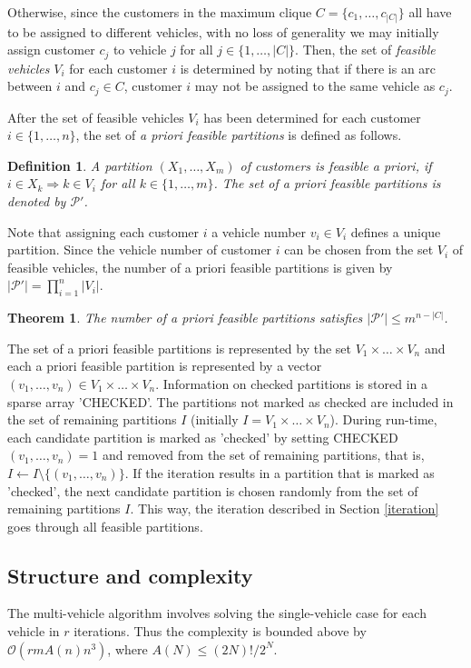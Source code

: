\documentclass[dissertation,draft*]{aaltoseries}
\newtheorem{theorem}{Theorem}
\newtheorem*{definition}{Definition}
\begin{document}
Otherwise, since the customers in the maximum clique $C = \{c_1,\ldots,c_{|C|}\}$ all have to be assigned to different vehicles, 
with no loss of generality we may initially assign customer $c_j$ to vehicle $j$ for all $j \in \{1,\ldots,|C|\}$.
Then, the set of \emph{feasible vehicles} $V_i$ for each customer $i$ is determined by noting that if there is an 
arc between $i$ and $c_j \in C$, customer $i$ may not be assigned to the same vehicle as $c_j$.

After the set of feasible vehicles $V_i$ has been determined for each customer $i \in \{1,\ldots,n\}$,
the set of \emph{a priori feasible partitions} is defined as follows.
\begin{definition}
A partition $(X_1,\ldots,X_m)$ of customers is feasible a priori, if $i \in X_k \Rightarrow k \in V_i$ for all $k \in \{1,\ldots,m\}$.
The set of a priori feasible partitions is denoted by $\mathcal{P}'$.
\end{definition}
Note that assigning each customer $i$ a vehicle number $v_i \in V_i$ defines a unique partition.
Since the vehicle number of customer $i$ can be chosen from the set $V_i$ of feasible vehicles, 
the number of a priori feasible partitions is given by $|\mathcal{P}'| = \prod_{i=1}^n |V_i|$.

\begin{theorem}
\label{partitions}
The number of a priori feasible partitions satisfies $|\mathcal{P}'| \leq m^{n-|C|}$.
\end{theorem}

The set of a priori feasible partitions is represented by the set $V_1 \times \ldots \times V_n$ and each a 
priori feasible partition is represented by a vector $(v_1,\ldots,v_n) \in V_1 \times \ldots \times V_n$.
Information on checked partitions is stored in a sparse array 'CHECKED'.
The partitions not marked as checked are included in the set of remaining partitions $I$
(initially $I = V_1 \times \ldots \times V_n$).
During run-time, each candidate partition is marked as 'checked' by setting CHECKED$(v_1,\ldots,v_n) = 1$ and
removed from the set of remaining partitions, that is, $I \leftarrow I \setminus \{(v_1,\ldots,v_n)\}$.
If the iteration results in a partition that is marked as 'checked', the 
next candidate partition is chosen randomly from the set of remaining partitions $I$.
This way, the iteration described in Section \ref{iteration} goes through all feasible partitions.



\subsection{Structure and complexity}
\label{mvstructure}
The multi-vehicle algorithm involves solving the single-vehicle case
for each vehicle in $r$ iterations. Thus the complexity is bounded above by $\mathcal{O}\left(rmA(n)n^3\right)$, 
where $A(N) \leq (2N)!/2^N$.                                                                                                                  
\end{document}
